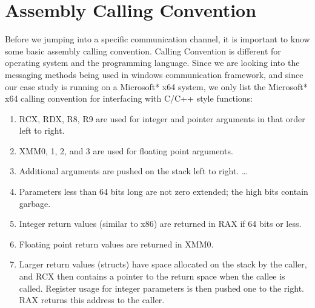 \section{Assembly Calling Convention}
Before we jumping into a specific communication channel, it is important to know some basic assembly calling convention.
Calling Convention is different for operating system and the programming language. Since we are looking into the messaging methods being used in windows communication framework, and since our case study is running on a Microsoft* x64 system, we only list the Microsoft* x64 calling convention for interfacing with C/C++ style functions:\par
\begin{enumerate}  
\item RCX, RDX, R8, R9 are used for integer and pointer arguments in that order left to right.
\item XMM0, 1, 2, and 3 are used for floating point arguments.
\item Additional arguments are pushed on the stack left to right. \ldots 
\item Parameters less than 64 bits long are not zero extended; the high bits contain garbage.
\item Integer return values (similar to x86) are returned in RAX if 64 bits or less.
\item Floating point return values are returned in XMM0.
\item Larger return values (structs) have space allocated on the stack by the caller, and RCX then contains a pointer to the return space when the callee is called. Register usage for integer parameters is then pushed one to the right. RAX returns this address to the caller.
\end{enumerate}


